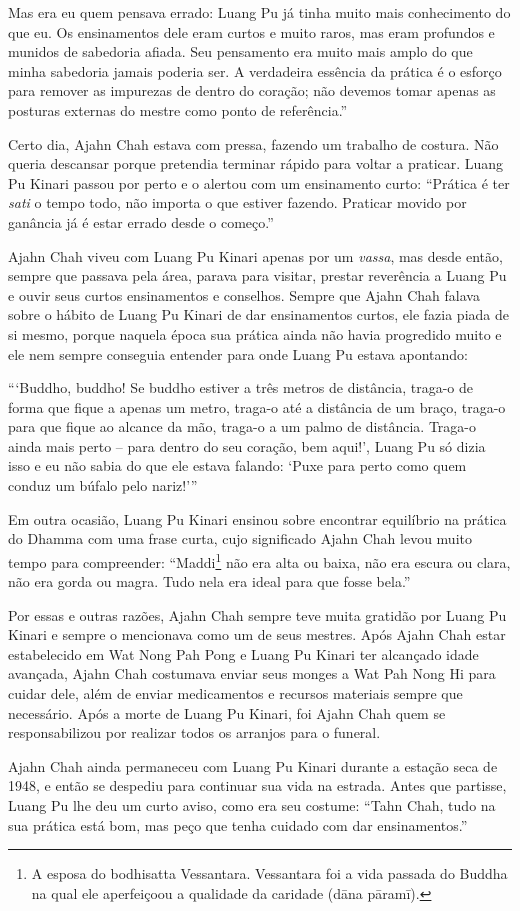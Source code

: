 Mas era eu quem pensava errado: Luang Pu já tinha muito mais
conhecimento do que eu. Os ensinamentos dele eram curtos e muito raros,
mas eram profundos e munidos de sabedoria afiada. Seu pensamento era
muito mais amplo do que minha sabedoria jamais poderia ser. A verdadeira
essência da prática é o esforço para remover as impurezas de dentro do
coração; não devemos tomar apenas as posturas externas do mestre como
ponto de referência.''

Certo dia, Ajahn Chah estava com pressa, fazendo um trabalho de costura.
Não queria descansar porque pretendia terminar rápido para voltar a
praticar. Luang Pu Kinari passou por perto e o alertou com um
ensinamento curto: ``Prática é ter \emph{sati} o tempo todo, não importa
o que estiver fazendo. Praticar movido por ganância já é estar errado
desde o começo.''

Ajahn Chah viveu com Luang Pu Kinari apenas por um \emph{vassa}, mas
desde então, sempre que passava pela área, parava para visitar, prestar
reverência a Luang Pu e ouvir seus curtos ensinamentos e conselhos.
Sempre que Ajahn Chah falava sobre o hábito de Luang Pu Kinari de dar
ensinamentos curtos, ele fazia piada de si mesmo, porque naquela época
sua prática ainda não havia progredido muito e ele nem sempre conseguia
entender para onde Luang Pu estava apontando:

```Buddho, buddho! Se buddho estiver a três metros de distância, traga-o
de forma que fique a apenas um metro, traga-o até a distância de um
braço, traga-o para que fique ao alcance da mão, traga-o a um palmo de
distância. Traga-o ainda mais perto -- para dentro do seu coração, bem
aqui!', Luang Pu só dizia isso e eu não sabia do que ele estava falando:
`Puxe para perto como quem conduz um búfalo pelo nariz!'''

Em outra ocasião, Luang Pu Kinari ensinou sobre encontrar equilíbrio na
prática do Dhamma com uma frase curta, cujo significado Ajahn Chah levou
muito tempo para compreender: ``Maddi\footnote{A esposa do bodhisatta
  Vessantara. Vessantara foi a vida passada do Buddha na qual ele
  aperfeiçoou a qualidade da caridade (dāna pāramī).} não era alta ou
baixa, não era escura ou clara, não era gorda ou magra. Tudo nela era
ideal para que fosse bela.''

Por essas e outras razões, Ajahn Chah sempre teve muita gratidão por
Luang Pu Kinari e sempre o mencionava como um de seus mestres. Após
Ajahn Chah estar estabelecido em Wat Nong Pah Pong e Luang Pu Kinari ter
alcançado idade avançada, Ajahn Chah costumava enviar seus monges a Wat
Pah Nong Hi para cuidar dele, além de enviar medicamentos e recursos
materiais sempre que necessário. Após a morte de Luang Pu Kinari, foi
Ajahn Chah quem se responsabilizou por realizar todos os arranjos para o
funeral.

Ajahn Chah ainda permaneceu com Luang Pu Kinari durante a estação seca
de 1948, e então se despediu para continuar sua vida na estrada. Antes
que partisse, Luang Pu lhe deu um curto aviso, como era seu costume:
``Tahn Chah, tudo na sua prática está bom, mas peço que tenha cuidado
com dar ensinamentos.''

